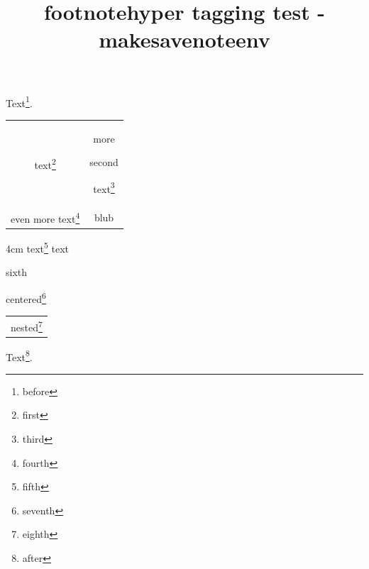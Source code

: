 \documentclass{article}
\title{footnotehyper tagging test - makesavenoteenv}
\begin{document}
Text\footnote{before}.

\begin{tabular}{cc}
text\footnote{first} & more\begin{footnote}second\end{footnote}
 text\footnote{third} \\
even more text\footnote{fourth} & blub
\end{tabular}

\begin{notedminipage}{4cm}
text\footnote{fifth} text\begin{footnote}sixth\end{footnote}
\end{notedminipage}

\begin{center}
centered\footnote{seventh}
\begin{tabular}{c}
nested\footnote{eighth}
\end{tabular}
\end{center}

Text\footnote{after}.
\end{document}
